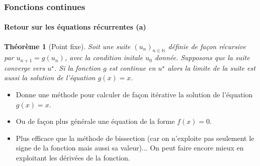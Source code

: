\documentclass[10pt,notheorems]{beamer}
\theoremstyle{plain}
\newtheorem{theorem}{Théorème}
\theoremstyle{definition} %
\begin{document}
\begin{frame}
  \frametitle{Fonctions continues}
  \framesubtitle{Retour sur les équations récurrentes (a)}

  \begin{theorem}[Point fixe]
    Soit une suite $(u_n)_{n\in\mathbb N}$ définie de façon récursive par $u_{n+1} = g(u_n)$, avec la condition initale $u_0$ donnée. Supposons que la suite converge vers $u^{\star}$. Si la fonction $g$ est continue en $u^{\star}$ alors la limite de la suite est aussi la solution de l'équation $g(x) = x$.
  \end{theorem}

  \bigskip

  \begin{itemize}

  \item Donne une méthode pour calculer de façon itérative la solution de l'équation $g(x)=x$.\newline

  \item Ou de façon plus générale une équation de la forme $f(x) = 0$.\newline

  \item Plus efficace que la méthode de bissection (car on n'exploite pas seulement le signe de la fonction mais aussi sa valeur)... On peut faire encore mieux en exploitant les dérivées de la fonction.

  \end{itemize}

\end{frame}
\end{document}
